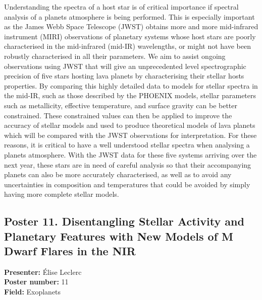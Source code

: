 Understanding the spectra of a host star is of critical importance if spectral analysis of a planets atmosphere is being performed. This is especially important as the James Webb Space Telescope (JWST) obtains more and more mid-infrared instrument (MIRI) observations of planetary systems whose host stars are poorly characterised in the mid-infrared (mid-IR) wavelengths, or might not have been robustly characterised in all their parameters. We aim to assist ongoing observations using JWST that will give an unprecedented level spectrographic precision of five stars hosting lava planets by characterising their stellar hosts properties. By comparing this highly detailed data to models for stellar spectra in the mid-IR, such as those described by the PHOENIX models, stellar parameters such as metallicity, effective temperature, and surface gravity can be better constrained. These constrained values can then be applied to improve the accuracy of stellar models and used to produce theoretical models of lava planets which will be compared with the JWST observations for interpretation. For these reasons, it is critical to have a well understood stellar spectra when analysing a planets atmosphere. With the JWST data for these five systems arriving over the next year, these stars are in need of careful analysis so that their accompanying planets can also be more accurately characterised, as well as to avoid any uncertainties in composition and temperatures that could be avoided by simply having more complete stellar models.

\hypertarget{poster-abstract-talk-299}{}\label{poster-abstract-page-talk-299}
\subsection*{Poster 11. Disentangling Stellar Activity and Planetary Features with New Models of M Dwarf Flares in the NIR}
\textbf{Presenter:} Élise Leclerc\\
\textbf{Poster number:} 11\\
\textbf{Field:} Exoplanets

